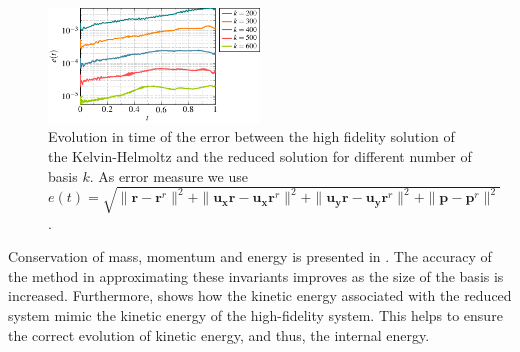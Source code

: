\begin{figure}[t]
\centering
	\includegraphics[width=0.5\textwidth]{./TikzFigures/thesis-figure4}
\caption{Evolution in time of the error  between the high fidelity solution of the Kelvin-Helmoltz and the reduced solution for different number of basis $k$. As error measure we use $e(t)=\sqrt{\|\mathbf{r}-\mathbf{r}^r\|^2+\|\mathbf{u_xr}-\mathbf{u_xr}^r\|^2 + \|\mathbf{u_yr}-\mathbf{u_yr}^r\|^2 + \|\mathbf{p}-\mathbf{p}^r\|^2}$.}
\label{p4.fig:error_decay_KH}
\end{figure}

Conservation of mass, momentum and energy is presented in . The accuracy of the method in approximating these invariants improves as the size of the basis is increased. Furthermore,  shows how the kinetic energy associated with the reduced system mimic the kinetic energy of the high-fidelity system. This helps to ensure the correct evolution of kinetic energy, and thus, the internal energy.

